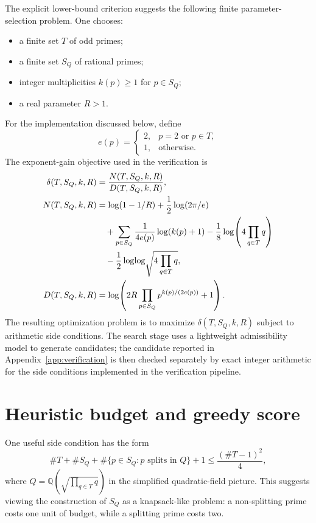 \documentclass[a4paper,12pt]{article}
\begin{document}
The explicit lower-bound criterion suggests the following finite parameter-selection problem.  One chooses:
\begin{itemize}
  \item a finite set $T$ of odd primes;
  \item a finite set $S_Q$ of rational primes;
  \item integer multiplicities $k(p)\geq 1$ for $p\in S_Q$;
  \item a real parameter $R>1$.
\end{itemize}

For the implementation discussed below, define
\[
  e(p)=
  \begin{cases}
  2, & p=2\text{ or }p\in T,\\
  1, & \text{otherwise.}
  \end{cases}
\]
The exponent-gain objective used in the verification is
\begin{align}
\delta(T,S_Q,k,R)&=\frac{N(T,S_Q,k,R)}{D(T,S_Q,k,R)},\label{eq:delta-objective}\\
N(T,S_Q,k,R)&=\log(1-1/R)+\frac12\log(2\pi/e)\notag\\
&\quad+\sum_{p\in S_Q}\frac{1}{4e(p)}\log(k(p)+1)
-\frac18\log\!\left(4\prod_{q\in T}q\right)\notag\\
&\quad-\frac12\log\!\log\!\sqrt{4\prod_{q\in T}q},\notag\\
D(T,S_Q,k,R)&=\log\!\left(2R\prod_{p\in S_Q}p^{k(p)/(2e(p))}+1\right).\notag
\end{align}
The resulting optimization problem is to maximize $\delta(T,S_Q,k,R)$ subject to arithmetic side conditions.  The search stage uses a lightweight admissibility model to generate candidates; the candidate reported in Appendix~\ref{app:verification} is then checked separately by exact integer arithmetic for the side conditions implemented in the verification pipeline.

\section{Heuristic budget and greedy score}

One useful side condition has the form
\[
  \#T+\#S_Q+\#\{p\in S_Q:p\text{ splits in }Q\}+1
  \leq \frac{(\#T-1)^2}{4},
\]
where $Q=\mathbb{Q}\!\left(\sqrt{\prod_{q\in T}q}\right)$ in the simplified quadratic-field picture.  This suggests viewing the construction of $S_Q$ as a knapsack-like problem: a non-splitting prime costs one unit of budget, while a splitting prime costs two.
\end{document}
